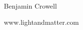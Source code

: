 \thispagestyle{empty}

\vspace{100mm}

{\sffamily


\noindent Benjamin Crowell

\noindent www.lightandmatter.com

}
